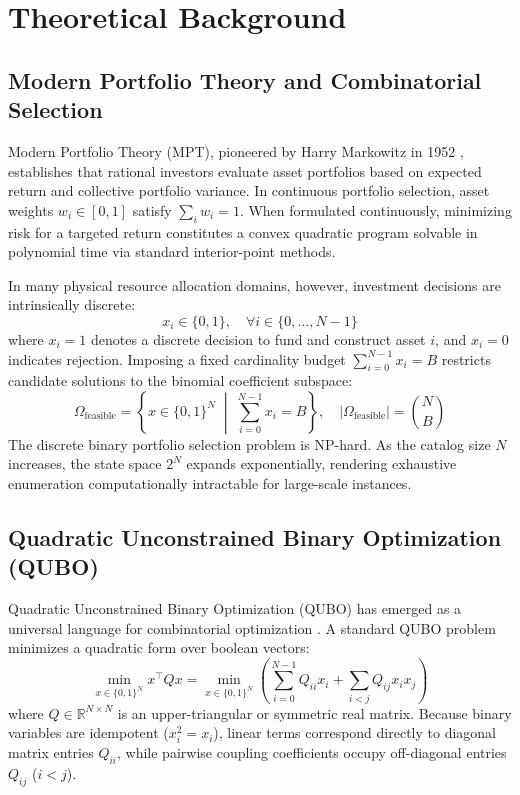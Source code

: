 \chapter{Theoretical Background}
\label{chap:background}

\section{Modern Portfolio Theory and Combinatorial Selection}
Modern Portfolio Theory (MPT), pioneered by Harry Markowitz in 1952 \cite{markowitz1952portfolio}, establishes that rational investors evaluate asset portfolios based on expected return and collective portfolio variance. In continuous portfolio selection, asset weights $w_i \in [0, 1]$ satisfy $\sum_{i} w_i = 1$. When formulated continuously, minimizing risk for a targeted return constitutes a convex quadratic program solvable in polynomial time via standard interior-point methods.

In many physical resource allocation domains, however, investment decisions are intrinsically discrete:
\begin{equation}
x_i \in \{0, 1\}, \quad \forall i \in \{0, \dots, N-1\}
\end{equation}
where $x_i = 1$ denotes a discrete decision to fund and construct asset $i$, and $x_i = 0$ indicates rejection. Imposing a fixed cardinality budget $\sum_{i=0}^{N-1} x_i = B$ restricts candidate solutions to the binomial coefficient subspace:
\begin{equation}
\Omega_{\text{feasible}} = \left\{ x \in \{0, 1\}^N \;\middle|\; \sum_{i=0}^{N-1} x_i = B \right\}, \quad |\Omega_{\text{feasible}}| = \binom{N}{B}
\end{equation}
The discrete binary portfolio selection problem is NP-hard. As the catalog size $N$ increases, the state space $2^N$ expands exponentially, rendering exhaustive enumeration computationally intractable for large-scale instances.

\section{Quadratic Unconstrained Binary Optimization (QUBO)}
Quadratic Unconstrained Binary Optimization (QUBO) has emerged as a universal language for combinatorial optimization \cite{glover2018tutorial, lucas2014ising}. A standard QUBO problem minimizes a quadratic form over boolean vectors:
\begin{equation}
\min_{x \in \{0, 1\}^N} x^\top Q x = \min_{x \in \{0, 1\}^N} \left( \sum_{i=0}^{N-1} Q_{ii} x_i + \sum_{i < j} Q_{ij} x_i x_j \right)
\end{equation}
where $Q \in \mathbb{R}^{N \times N}$ is an upper-triangular or symmetric real matrix. Because binary variables are idempotent ($x_i^2 = x_i$), linear terms correspond directly to diagonal matrix entries $Q_{ii}$, while pairwise coupling coefficients occupy off-diagonal entries $Q_{ij}$ ($i < j$).

